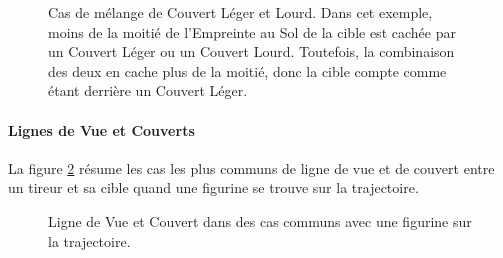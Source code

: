 \newcommand{\figureSHCHill}{Colline}
\newcommand{\figureSHCHeightOne}{Taille 1}
\newcommand{\figureSHCHeightTwo}{Taille 2}
\newcommand{\figureSHCLessthanhalffromhardcover}{\normalfontsize{\textit{Moins de 50 \% en Couvert Lourd}}}
\newcommand{\figureSHCLessthanhalffromsoftcover}{\normalfontsize{\textit{Moins de 50 \% en Couvert Léger}}}
\newcommand{\figureSHCMorethanhalftotal}{\normalfontsize{\textit{Plus de 50 \% en tout}}}

\begin{figure}[!htbp]
\begin{minipage}[t]{0.45\textwidth}
\def\svgwidth{\textwidth}

\end{minipage}\hfill\begin{minipage}[b]{0.52\textwidth}
\caption{Cas de mélange de Couvert Léger et Lourd.\vspace*{10pt}\newline
Dans cet exemple, moins de la moitié de l'Empreinte au Sol de la cible est cachée par un Couvert Léger ou un Couvert Lourd. Toutefois, la combinaison des deux en cache plus de la moitié, donc la cible compte comme étant derrière un Couvert Léger.}
\label{figure/soft_and_hard_cover}
\end{minipage}
\end{figure}

\clearpage
\paragraph{Lignes de Vue et Couverts}

La figure \ref{figure/line_of_sight_and_cover} résume les cas les plus communs de ligne de vue et de couvert entre un tireur et sa cible quand une figurine se trouve sur la trajectoire.

\newcommand{\figureLoSCSoftcover}{\Largefontsize{Couvert Léger}}
\newcommand{\figureLoSCHardcover}{\Largefontsize{Couvert Lourd}}
\newcommand{\figureLoSCNocover}{\Largefontsize{Pas de Couvert}}
\newcommand{\figureLoSCNolineofsight}{\Largefontsize{Pas de Ligne de Vue}}
\newcommand{\figureLoSCSmall}{Petit}
\newcommand{\figureLoSCMedium}{Moyen}
\newcommand{\figureLoSCLarge}{Grand}

\begin{figure}[!htbp]
\centering
\def\svgwidth{12cm}

\caption{Ligne de Vue et Couvert dans des cas communs avec une figurine sur la trajectoire.}
\label{figure/line_of_sight_and_cover}
\end{figure}

